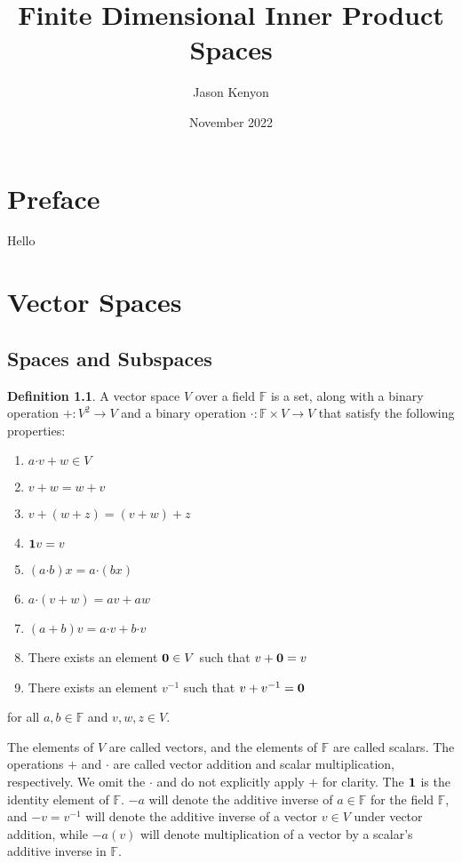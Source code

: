 \documentclass[oneside, 12pt]{book}
\title{Finite Dimensional Inner Product Spaces}
\author{Jason Kenyon}
\date{November 2022}
\theoremstyle{definition}
\newtheorem{defn}{Definition}[section]
\begin{document}
\frontmatter
\maketitle
\cleardoublepage
{}
\tableofcontents
\chapter*{Preface}
Hello
\mainmatter
\chapter{Vector Spaces}
\section{Spaces and Subspaces}
\begin{defn}
  \label{defn_vspace}
  A vector space $V$ over a field $\mathbb{F}$ is a set, along with a binary operation $+: V^{2} \to V$ and a binary operation $\boldsymbol{\cdot}: \mathbb{F} \times V \to V$ that satisfy the following properties:
  \begin{enumerate}
    \item $a\boldsymbol{\cdot}v+w \in V$
    \item $v+w=w+v$
    \item $v+(w+z)=(v+w)+z$
    \item $\bold{1}v=v$
    \item $(a\boldsymbol{\cdot}b)x=a\boldsymbol{\cdot}(bx)$
    \item $a\boldsymbol{\cdot}(v+w)=av+aw$
    \item $(a+b)v=a\boldsymbol{\cdot}v+b\boldsymbol{\cdot}v$
    \item There exists an element $\bold{0} \in V$ such that $v+\bold{0}=v$
    \item There exists an element $v^{-1}$ such that $v+v^{-1}=\bold{0}$
  \end{enumerate}
  for all $a, b \in \mathbb{F}$ and $v,w,z \in V$.
\end{defn}
The elements of $V$ are called vectors, and the elements of $\mathbb{F}$ are called scalars. The operations $+$ and $\boldsymbol{\cdot}$ are called vector addition and scalar multiplication, respectively. We omit the $\boldsymbol{\cdot}$ and do not explicitly apply $+$ for clarity. The $\bold{1}$ is the identity element of $\mathbb{F}$. $-a$ will denote the additive inverse of $a \in \mathbb{F}$ for the field $\mathbb{F}$, and $-v=v^{-1}$ will denote the additive inverse of a vector $v \in V$ under vector addition, while $-a(v)$ will denote multiplication of a vector by a scalar's additive inverse in $\mathbb{F}$.
\end{document}
